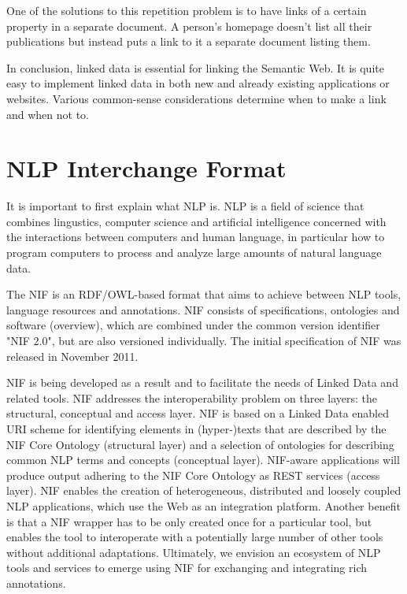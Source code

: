 \documentclass[thesis=M,english,hidelinks]{FITthesis}[2019/12/23]
\begin{document}
One of the solutions to this repetition problem is to have links of a certain property in a separate document.   A person's homepage doesn't list all their publications but instead puts a link to it a separate document listing them.

In conclusion, linked data is essential for linking the Semantic Web. It is quite easy to implement linked data in both new and already existing applications or websites. Various common-sense considerations determine when to make a link and when not to.

\section{NLP Interchange Format}

It is important to first explain what \gls{NLP} is. \gls{NLP} is a field of science that combines lingustics, computer science and artificial intelligence concerned with the interactions between computers and human language, in particular how to program computers to process and analyze large amounts of natural language data.

The \gls{NIF} is an \gls{RDF}/\gls{OWL}-based format that aims to achieve between \gls{NLP} tools, language resources and annotations. NIF consists of specifications, ontologies and software (overview), which are combined under the common version identifier "NIF 2.0", but are also versioned individually\cite{nlp_cite}. The initial specification of \gls{NIF} was released in November 2011.

\gls{NIF} is being developed as a result and to facilitate the needs of Linked Data and related tools.  NIF addresses the interoperability problem on three layers: the structural, conceptual and access layer. NIF is based on a Linked Data enabled URI scheme for identifying elements in (hyper-)texts that are described by the NIF Core Ontology (structural layer) and a selection of ontologies for describing common NLP terms and concepts (conceptual layer). NIF-aware applications will produce output adhering to the NIF Core Ontology as REST services (access layer). NIF enables the creation of heterogeneous, distributed and loosely coupled NLP applications, which use the Web as an integration platform. Another benefit is
that a NIF wrapper has to be only created once for a particular tool, but enables the tool to interoperate with a potentially large number of other tools without additional adaptations. Ultimately, we envision an ecosystem of NLP tools and services to emerge using NIF for exchanging and integrating rich annotations.
\end{document}
